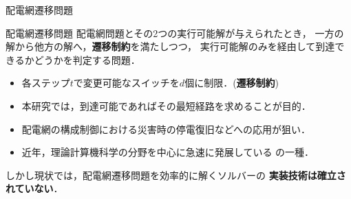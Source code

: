 \documentclass[dvipdfmx,11pt]{beamer}
\begin{document}
\begin{frame}{配電網遷移問題}
 \begin{alertblock}{配電網遷移問題}
  配電網問題とその2つの実行可能解が与えられたとき，
  一方の解から他方の解へ，\alert{\bf 遷移制約}を満たしつつ，
  実行可能解のみを経由して到達できるかどうかを判定する問題．
  \begin{itemize}
  \item 各ステップ$t$で変更可能なスイッチを$d$個に制限．(\textbf{遷移制約})
  \item 本研究では，到達可能であればその最短経路を求めることが目的．
  \end{itemize}
 \end{alertblock}
 \begin{itemize}
  \item 配電網の構成制御における災害時の停電復旧などへの応用が狙い．
  \item 近年，理論計算機科学の分野を中心に急速に発展している
        の一種．
 \end{itemize}
 \begin{alertblock}{}
  しかし現状では，配電網遷移問題を効率的に解くソルバーの
  \alert{\bf 実装技術は確立されていない}．
 \end{alertblock}
\end{frame}
\end{document}
